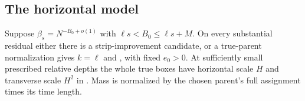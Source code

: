 \subsection{The horizontal model}

\begin{proposition}\label{prop:horizontal-model}
Suppose \(\beta_s=N^{-B_0+o(1)}\) with
\(\ell s<B_0\leq\ell s+M\).  On every substantial residual either
there is a strip-improvement candidate, or a true-parent normalization
gives \(k=\ell\) and , with fixed
\(e_0>0\).  At sufficiently small prescribed relative depths the
whole true boxes have horizontal scale \(H\) and transverse scale
\(H^2\) in .
Mass is normalized by the chosen parent's full assignment times
its time length.
\end{proposition}
